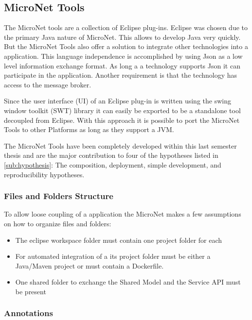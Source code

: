 \subsection{MicroNet Tools}
\label{sub:tools}

The MicroNet tools are a collection of Eclipse plug-ins. Eclipse was chosen due
to the primary Java nature of MicroNet. This allows to develop Java \mss{} very
quickly. But the MicroNet Tools also offer a solution to integrate other
technologies into a \ms{} application. This language independence is
accomplished by using Json as a low level information exchange format. As long a
a technology supports Json it can participate in the application. Another
requirement is that the technology has access to the message broker.

Since the user interface (UI) of an Eclipse plug-in is written using the swing
window toolkit (SWT) library it can easily be exported to be a standalone tool
decoupled from Eclipse. With this approach it is possible to port the MicroNet
Tools to other Platforms as long as they support a JVM.

The MicroNet Tools have been completely developed within this last semester
thesis and are the major contribution to four of the hypotheses listed in
\autoref{sub:hypothesis}: The composition, deployment, simple development, and 
reproducibility hypotheses.

\subsubsection{Files and Folders Structure}

To allow loose coupling of a \ms{} application the MicroNet makes a few
assumptions on how to organize files and folders:

\begin{itemize}
  \item The eclipse workspace folder must contain one project folder for each
  \ms{}
  \item For automated integration of a \ms{} its project folder must be either a
  Java/Maven project or must contain a Dockerfile.
 \item One shared folder to exchange the Shared Model and the Service API must
 be present
\end{itemize}  

\subsubsection{Annotations}

